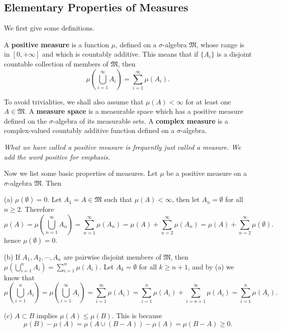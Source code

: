 \subsection{Elementary Properties of Measures}
We first give some definitions.
\begin{definition}
A \textbf{positive measure} is a function $\mu$, defined on a $\sigma$-algebra $\mathfrak{M}$, whose range is in $[0,+\infty]$ and which is countably additive. This means that if $\{A_i\}$ is a disjoint countable collection of members of $\mathfrak{M}$, then 
$$\mu\left(\bigcup_{i=1}^\infty A_i\right)=\sum_{i=1}^\infty\mu(A_i).$$
\end{definition}
To avoid trivialities, we shall also assume that $\mu(A)<\infty$ for at least one $A\in\mathfrak{M}$. A \textbf{measure space} is a measurable space which has a positive measure defined on the $\sigma$-algebra of its measurable sets. A \textbf{complex measure} is a complex-valued countably additive function defined on a $\sigma$-algebra.
\begin{note}\em
What we have called a \textit{positive} measure is frequently just called a \textit{measure}. We add the word \textit{positive} for emphasis.
\end{note}
Now we list some basic properties of measures. Let $\mu$ be a positive measure on a $\sigma$-algebra $\mathfrak{M}$. Then \par
(a) $\mu(\emptyset)=0$. Let $A_1=A\in\mathfrak{M}$ such that $\mu(A)<\infty$, then let $A_n=\emptyset$ for all $n\ge 2$. Therefore 
$$
\mu \left( A \right) =\mu \left( \bigcup_{n=1}^{\infty}{A_n} \right) =\sum_{n=1}^{\infty}{\mu \left( A_n \right)}=\mu \left( A \right) +\sum_{n=2}^{\infty}{\mu \left( A_n \right)}=\mu \left( A \right) +\sum_{n=2}^{\infty}{\mu \left( \emptyset \right)}.
$$
hence $\mu(\emptyset)=0$.\par
(b) If $A_1,A_2,\cdots,A_n$ are pairwise disjoint members of $\mathfrak{M}$, then $\mu \left( \bigcup_{i=1}^n{A_i} \right) =\sum_{i=1}^n{\mu \left( A_i \right)}$. Let $A_k=\emptyset$ for all $k\ge n+1$, and by (a) we know that 
$$
\mu \left( \bigcup_{i=1}^n{A_i} \right) =\mu \left( \bigcup_{i=1}^{\infty}{A_i} \right) =\sum_{i=1}^{\infty}{\mu \left( A_i \right)}=\sum_{i=1}^n{\mu \left( A_i \right)}+\sum_{i=n+1}^{\infty}{\mu \left( A_i \right)}=\sum_{i=1}^n{\mu \left( A_i \right)}.
$$\par
(c) $A\subset B$ implies $\mu(A)\le\mu(B)$. This is because 
$$
\mu \left( B \right) -\mu \left( A \right) =\mu \left( A\cup \left( B-A \right) \right) -\mu \left( A \right) =\mu \left( B-A \right) \ge 0.
$$\par
